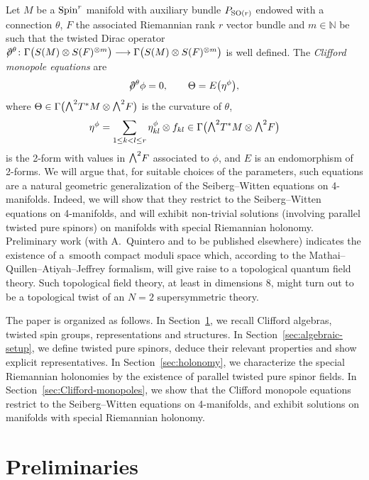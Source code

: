 \documentclass[10pt,a4paper]{amsart}
\newcommand{\ext}{\raise1pt\hbox{\small$\bigwedge$}}
\newcommand{\dirac}{/\kern-5pt\partial}
\newcommand{\lra}{\longrightarrow}
\numberwithin{equation}{section}
\begin{document}
Let $M$ be a ${\rm Spin}^r$ manifold with auxiliary bundle $P_{{\rm SO}(r)}$ endowed with a connection $\theta$, $F$ the associated Riemannian rank $r$ vector bundle
and $m\in\mathbb{N}$ be such that the twisted Dirac operator $\dirac^\theta\colon \Gamma\big(S(M)\otimes S(F)^{\otimes m}\big)\lra \Gamma\big(S(M)\otimes S(F)^{\otimes m}\big)$ is well defined. The {\em Clifford monopole equations} are
\begin{gather*}
 \dirac^\theta\phi = 0,\qquad
\Theta = E\big(\eta^\phi\big),
\end{gather*}
where
$ \Theta \in \Gamma\big(\ext^2T^*M\otimes\ext^2 F\big)$ is the curvature of $\theta$,
\begin{gather*}
 \eta^\phi = \sum_{1\leq k<l \leq r} \eta_{kl}^\phi\otimes f_{kl} \in \Gamma\big(\ext^2T^*M\otimes\ext^2 F\big)
\end{gather*}
is the 2-form with values in $\ext^2 F$ associated to $\phi$, and $E$ is an endomorphism of 2-forms. We will argue that, for suitable choices of the parameters, such equations
are a natural geometric generalization of the Seiberg--Witten equations on 4-manifolds. Indeed, we will show that they restrict to the Seiberg--Witten equations on 4-manifolds, and will exhibit non-trivial solutions (involving parallel twisted pure spinors) on manifolds with special Riemannian holonomy. Preliminary work (with A.~Quintero and to be published elsewhere) indicates the existence of a~smooth compact moduli space which, according to the Mathai--Quillen--Atiyah--Jeffrey for\-ma\-lism, will give raise to a topological quantum field theory. Such topological field theory, at least in dimensions $8$, might turn out to be a topological twist of an $N=2$ supersymmetric theory.


The paper is organized as follows. In Section~\ref{preliminaries}, we recall Clifford algebras, twisted spin groups, representations and structures. In Section~\ref{sec:algebraic-setup}, we define twisted pure spinors, deduce their relevant properties and show explicit representatives. In Section~\ref{sec:holonomy}, we characterize the special Riemannian holonomies by the existence of parallel twisted pure spinor fields. In Section~\ref{sec:Clifford-monopoles}, we show that the Clifford monopole equations restrict to the Seiberg--Witten equations on 4-manifolds, and exhibit solutions on manifolds with special Riemannian holonomy.

\section{Preliminaries}\label{preliminaries}
\end{document}
